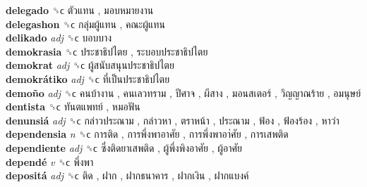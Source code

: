 \textbf{delegado} ␝ϲ   ตัวแทน ,  มอบหมายงาน   \\
\textbf{delegashon} ␝ϲ   กลุ่มผู้แทน ,  คณะผู้แทน   \\
\textbf{delikado} \emph{adj}  ␝ϲ   บอบบาง   \\
\textbf{demokrasia} ␝ϲ   ประชาธิปไตย ,  ระบอบประชาธิปไตย   \\
\textbf{demokrat} \emph{adj}  ␝ϲ   ผู้สนับสนุนประชาธิปไตย   \\
\textbf{demokrátiko} \emph{adj}  ␝ϲ   ที่เป็นประชาธิปไตย   \\
\textbf{demoño} \emph{adj}  ␝ϲ   คนบ้างาน ,  คนเลวทราม ,  ปีศาจ ,  ผีสาง ,  มอนสเตอร์ ,  วิญญาณร้าย ,  อมนุษย์   \\
\textbf{dentista} ␝ϲ   ทันตแพทย์ ,  หมอฟัน   \\
\textbf{denunsiá} \emph{adj}  ␝ϲ   กล่าวประณาม ,  กล่าวหา ,  ตราหน้า ,  ประณาม ,  ฟ้อง ,  ฟ้องร้อง ,  หาว่า   \\
\textbf{dependensia} \emph{n}  ␝ϲ   การติด ,  การพึ่งพาอาศัย ,  การพึ่งพาอา่ศัย ,  การเสพติด   \\
\textbf{dependiente} \emph{adj}  ␝ϲ   ซึ่งติดยาเสพติด ,  ผู้พึ่งพิงอาศัย ,  ผู้อาศัย   \\
\textbf{dependé} \emph{v}  ␝ϲ   พึ่งพา   \\
\textbf{depositá} \emph{adj}  ␝ϲ   ติด ,  ฝาก ,  ฝากธนาคาร ,  ฝากเงิน ,  ฝากแบงค์   \\
